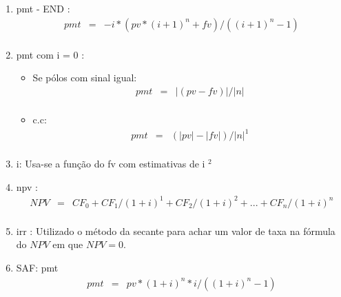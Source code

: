 \begin{enumerate}
\item  pmt - END \cite{arachnoid}:
\begin{eqnarray*}
	pmt &=& - i*( pv*(i+1)^{n} + fv ) / ((i+1)^{n} - 1) \\	
\end{eqnarray*}  
 

\item  pmt com i = 0 \cite{arachnoid2}:  

\begin{itemize}
 \item Se pólos com sinal igual:
	\begin{eqnarray*}
 		 pmt &=& |(pv - fv)| / |n| \\	
	\end{eqnarray*}
  \item c.c:
	\begin{eqnarray*}
 		pmt &=& (|pv| - |fv|) / |n|  ^{1} \\	 
	\end{eqnarray*}
\end{itemize}


\item  i: Usa-se a função do fv com estimativas de i $ ^{2} $  \cite{arachnoid2}


\item  npv \cite{man1}:
\begin{eqnarray*}
 	NPV &=& CF_{0} + CF_{1} / (1+i)^{1} + CF_{2} / (1+i)^{2} + ... + CF_{n} / (1+i)^{n} \\
\end{eqnarray*}
 

\item  irr \cite {matFinanceira2}: Utilizado o método da secante para achar um valor de taxa na fórmula do $NPV$ em que $ NPV = 0. $ 


\item SAF: pmt \cite{adail}
\begin{eqnarray*}
 	pmt &=& pv * (1+i)^{n} * i / ((1+i)^{n}-1) \\
\end{eqnarray*}
 

\end{enumerate}

